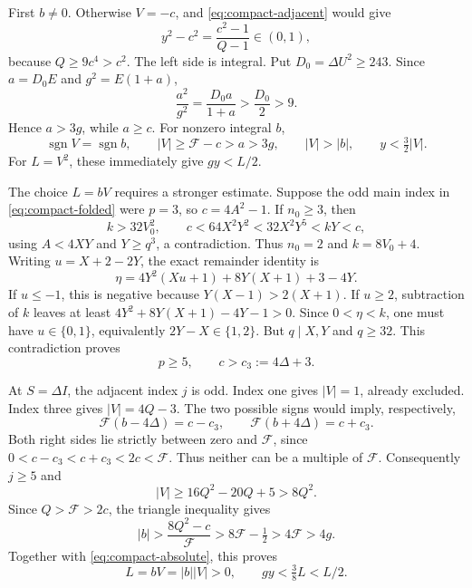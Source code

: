 First \(b\ne0\).  Otherwise \(V=-c\), and
\eqref{eq:compact-adjacent} would give
\[
 y^2-c^2=\frac{c^2-1}{Q-1}\in(0,1),
\]
because \(Q\ge9c^4>c^2\).  The left side is integral.
Put \(D_0=\Delta U^2\ge243\).  Since \(a=D_0E\) and
\(g^2=E(1+a)\),
\[
 \frac{a^2}{g^2}=\frac{D_0a}{1+a}>\frac{D_0}{2}>9.
\]
Hence \(a>3g\), while \(a\ge c\).  For nonzero integral \(b\),
\begin{equation}
 \operatorname{sgn}V=\operatorname{sgn}b,\qquad
 |V|\ge\mathcal F-c>a>3g,\qquad |V|>|b|,\qquad
 y<\tfrac32|V|.                                    \label{eq:compact-absolute}
\end{equation}
For \(L=V^2\), these immediately give \(gy<L/2\).

The choice \(L=bV\) requires a stronger estimate.  Suppose the odd
main index in \eqref{eq:compact-folded} were \(p=3\), so
\(c=4A^2-1\).  If \(n_0\ge3\), then
\[
 k>32V_0^2,\qquad
 c<64X^2Y^2<32X^2Y^5<kY<c,
\]
using \(A<4XY\) and \(Y\ge q^3\), a contradiction.
Thus \(n_0=2\) and \(k=8V_0+4\).
Writing \(u=X+2-2Y\), the exact remainder identity is
\begin{equation}
 \eta=4Y^2(Xu+1)+8Y(X+1)+3-4Y.                    \label{eq:compact-p3}
\end{equation}
If \(u\le-1\), this is negative because
\(Y(X-1)>2(X+1)\).  If \(u\ge2\), subtraction of \(k\) leaves at
least \(4Y^2+8Y(X+1)-4Y-1>0\).  Since \(0<\eta<k\), one must have
\(u\in\{0,1\}\), equivalently \(2Y-X\in\{1,2\}\).  But
\(q\mid X,Y\) and \(q\ge32\).  This contradiction proves
\begin{equation}
 p\ge5,\qquad c>c_3:=4\Delta+3.                   \label{eq:compact-p5}
\end{equation}

At \(S=\Delta I\), the adjacent index \(j\) is odd.  Index one gives
\(|V|=1\), already excluded.  Index three gives \(|V|=4Q-3\).
The two possible signs would imply, respectively,
\[
 \mathcal F(b-4\Delta)=c-c_3,\qquad
 \mathcal F(b+4\Delta)=c+c_3.
\]
Both right sides lie strictly between zero and \(\mathcal F\), since
\(0<c-c_3<c+c_3<2c<\mathcal F\).  Thus neither can be a multiple of
\(\mathcal F\).  Consequently \(j\ge5\) and
\[
 |V|\ge16Q^2-20Q+5>8Q^2.
\]
Since \(Q>\mathcal F>2c\), the triangle inequality gives
\[
 |b|>\frac{8Q^2-c}{\mathcal F}
       >8\mathcal F-\tfrac12>4\mathcal F>4g.
\]
Together with \eqref{eq:compact-absolute}, this proves
\begin{equation}
 L=bV=|b||V|>0,\qquad gy<\tfrac38L<L/2.            \label{eq:compact-bvbound}
\end{equation}

